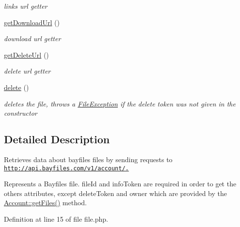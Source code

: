 \begin{DoxyCompactItemize}
\begin{DoxyCompactList}\small\item\em links url getter \end{DoxyCompactList}\item 
\hypertarget{classFile_accbc8e239744ebc066ee473a0ae9c2bf}{
\hyperlink{classFile_accbc8e239744ebc066ee473a0ae9c2bf}{getDownloadUrl} ()}
\label{classFile_accbc8e239744ebc066ee473a0ae9c2bf}

\begin{DoxyCompactList}\small\item\em download url getter \end{DoxyCompactList}\item 
\hypertarget{classFile_ad3be79852f78b701fe99b85c81e2cdd3}{
\hyperlink{classFile_ad3be79852f78b701fe99b85c81e2cdd3}{getDeleteUrl} ()}
\label{classFile_ad3be79852f78b701fe99b85c81e2cdd3}

\begin{DoxyCompactList}\small\item\em delete url getter \end{DoxyCompactList}\item 
\hypertarget{classFile_a0abbca3d8b81e29f01db75ec19d0ef84}{
\hyperlink{classFile_a0abbca3d8b81e29f01db75ec19d0ef84}{delete} ()}
\label{classFile_a0abbca3d8b81e29f01db75ec19d0ef84}

\begin{DoxyCompactList}\small\item\em deletes the file, throws a \hyperlink{classFileException}{FileException} if the delete token was not given in the constructor \end{DoxyCompactList}\end{DoxyCompactItemize}


\subsection{Detailed Description}
Retrieves data about bayfiles files by sending requests to \href{http://api.bayfiles.com/v1/account/.}{\tt http://api.bayfiles.com/v1/account/.} 

Represents a Bayfiles file. fileId and infoToken are required in order to get the others attributes, except deleteToken and owner which are provided by the \hyperlink{classAccount_aa0dc98ce30abcd3d1a73c1a3e123a544}{Account::getFiles()} method. 

Definition at line 15 of file file.php.




